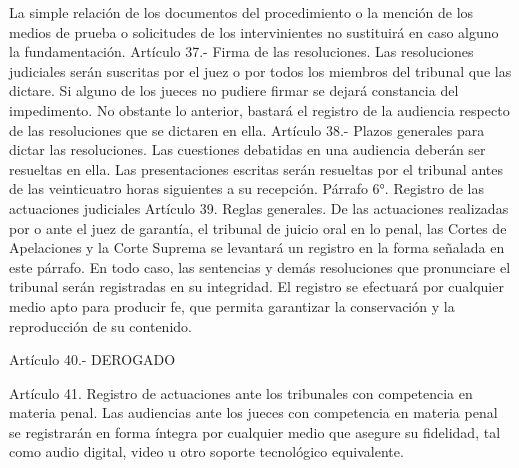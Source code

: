     La simple relación de los documentos del procedimiento o la mención de los medios de prueba o solicitudes de los intervinientes no sustituirá en caso alguno la fundamentación.
    Artículo 37.- Firma de las resoluciones. Las resoluciones judiciales serán suscritas por el juez o por todos los miembros del tribunal que las dictare. Si alguno de los jueces no pudiere firmar se dejará constancia del impedimento.
    No obstante lo anterior, bastará el registro de la audiencia respecto de las resoluciones que se dictaren en ella.
    Artículo 38.- Plazos generales para dictar las resoluciones. Las cuestiones debatidas en una audiencia deberán ser resueltas en ella.
    Las presentaciones escritas serán resueltas por el tribunal antes de las veinticuatro horas siguientes a su recepción.
    Párrafo 6°. Registro de las actuaciones judiciales
      Artículo 39. Reglas generales. De las actuaciones realizadas por o ante el juez de garantía, el tribunal de juicio oral en lo penal, las Cortes de Apelaciones y la Corte Suprema se levantará un registro en la forma señalada en este párrafo.
    En todo caso, las sentencias y demás resoluciones que pronunciare el tribunal serán registradas en su integridad.
    El registro se efectuará por cualquier medio apto para producir fe, que permita garantizar la conservación y la reproducción de su contenido.

    Artículo 40.- DEROGADO

    Artículo 41. Registro de actuaciones ante los tribunales con competencia en materia penal. Las audiencias ante los jueces con competencia en materia penal se registrarán en forma íntegra por cualquier medio que asegure su fidelidad, tal como audio digital, video u otro soporte tecnológico equivalente.

